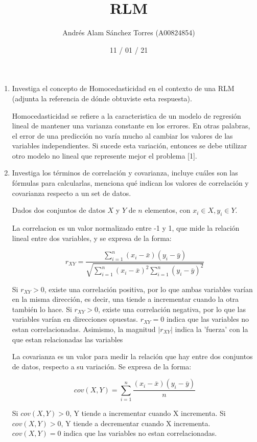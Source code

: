 \documentclass[]{article}
\title{\textbf{RLM}}
\date{\small 11 / 01 / 21}
\author{\small Andrés Alam Sánchez Torres (A00824854)}
\begin{document}
\maketitle

\begin{enumerate}
    \item Investiga el concepto de Homocedasticidad en el contexto de una RLM (adjunta la
    referencia de dónde obtuviste esta respuesta).

    Homocedasticidad se refiere a la caracteristica de un modelo de regresión lineal de mantener una 
    varianza constante en los errores. En otras palabras, el error de una predicción no varía mucho al 
    cambiar los valores de las variables independientes. Si sucede esta variación, entonces se debe 
    utilizar otro modelo no lineal que represente mejor el problema [1].


    \item Investiga los términos de correlación y covarianza, incluye cuáles son las fórmulas para
    calcularlas, menciona qué indican los valores de correlación y covarianza respecto a un
    set de datos. 

    Dados dos conjuntos de datos $X$ y $Y$ de $n$ elementos, con $x_{i} \in X, y_{i} \in Y$.

    La correlacion es un valor normalizado entre -1 y 1, que mide la relación lineal entre dos 
    variables, y se expresa de la forma:

    $$r_{XY} = \frac{\sum_{i=1}^{n}(x_{i} - \bar{x})(y_{i} - \bar{y})}{\sqrt{\sum_{i=1}^{n}(x_{i} - \bar{x})^2\sum_{i=1}^{n}(y_{i} - \bar{y})^2}}$$
    
    Si $r_{XY} > 0$, existe una correlación positiva, por lo que ambas variables varían en la misma 
    dirección, es decir, una tiende a incrementar cuando la otra también lo hace. Si $r_{XY} > 0$, 
    existe una correlación negativa, por lo que las variables varían en direcciones opuestas. 
    $r_{XY} = 0$ indica que las variables no estan correlacionadas. Asimismo, la magnitud $|r_{XY}|$
    indica la 'fuerza' con la que estan relacionadas las variables
    
    La covarianza es un valor para medir la relación que hay entre dos conjuntos de datos, respecto a 
    su variación. Se expresa de la forma:
    
    $$cov(X, Y) = \sum_{i=1}^{n}\frac{(x_{i} - \bar{x})(y_{i} - \bar{y})}{n}$$
    
    Si $cov(X, Y) > 0$, Y tiende a incrementar cuando X incrementa. Si $cov(X, Y) > 0$, Y tiende a 
    decrementar cuando X incrementa. $cov(X, Y) = 0$ indica que las variables no estan correlacionadas.


\end{enumerate}
\end{document}
